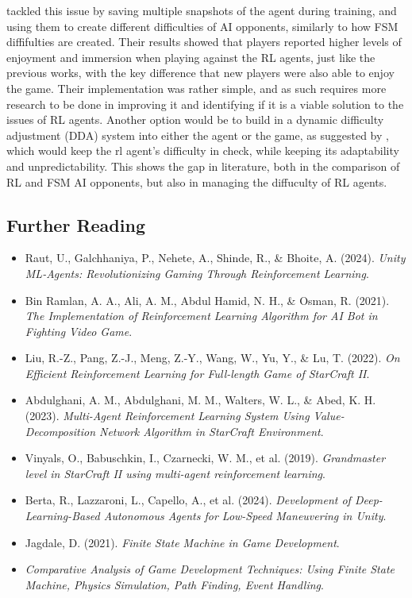 \documentclass[conference]{IEEEtran}
\begin{document}
\cite{grech_creating_2023} tackled this issue by saving multiple snapshots of the agent during training, and using them to create different difficulties of AI opponents, similarly to how FSM diffifulties are created.
Their results showed that players reported higher levels of enjoyment and immersion when playing against the RL agents, just like the previous works, with the key difference that new players were also able to enjoy
the game. Their implementation was rather simple, and as such requires more research to be done in improving it and identifying if it is a viable solution to the issues of RL agents. Another option would be
to build in a dynamic difficulty adjustment (DDA) system into either the agent or the game, as suggested by \cite{grech_creating_2023}, which would keep the rl agent's difficulty in check, while keeping its
adaptability and unpredictability. This shows the gap in literature, both in the comparison of RL and FSM AI opponents, but also in managing the diffuculty of RL agents.

\subsection{Further Reading}

\begin{itemize}
	\item Raut, U., Galchhaniya, P., Nehete, A., Shinde, R., \& Bhoite, A. (2024). \textit{Unity ML-Agents: Revolutionizing Gaming Through Reinforcement Learning}. \cite{raut_unity_2024}
	\item Bin Ramlan, A. A., Ali, A. M., Abdul Hamid, N. H., \& Osman, R. (2021). \textit{The Implementation of Reinforcement Learning Algorithm for AI Bot in Fighting Video Game}. \cite{bin_ramlan_implementation_2021}
	\item Liu, R.-Z., Pang, Z.-J., Meng, Z.-Y., Wang, W., Yu, Y., \& Lu, T. (2022). \textit{On Efficient Reinforcement Learning for Full-length Game of StarCraft II}. \cite{liu_efficient_2022}
	\item Abdulghani, A. M., Abdulghani, M. M., Walters, W. L., \& Abed, K. H. (2023). \textit{Multi-Agent Reinforcement Learning System Using Value-Decomposition Network Algorithm in StarCraft Environment}. \cite{abdulghani_multi-agent_2023}
	\item Vinyals, O., Babuschkin, I., Czarnecki, W. M., et al. (2019). \textit{Grandmaster level in StarCraft II using multi-agent reinforcement learning}. \cite{vinyals_grandmaster_2019}
	\item Berta, R., Lazzaroni, L., Capello, A., et al. (2024). \textit{Development of Deep-Learning-Based Autonomous Agents for Low-Speed Maneuvering in Unity}. \cite{berta_development_2024}
	\item Jagdale, D. (2021). \textit{Finite State Machine in Game Development}. \cite{jagdale_finite_2021}
	\item \textit{Comparative Analysis of Game Development Techniques: Using Finite State Machine, Physics Simulation, Path Finding, Event Handling}. \cite{noauthor_comparative_nodate}
\end{itemize}
\end{document}
